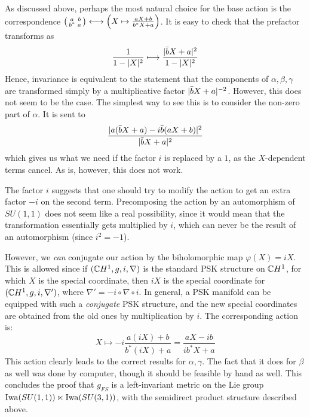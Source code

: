 As discussed above, perhaps the most natural choice for the base action is the correspondence 
$\begin{psmallmatrix}
	a & b \\ b^* & a
\end{psmallmatrix} \longleftrightarrow
\Big(X\mapsto \frac{aX+b}{b^*X+a}\Big)$. It is easy to check that the prefactor transforms as
\begin{equation*}
	\frac{1}{1-\lvert X \rvert^2}\longmapsto \frac{\lvert \bar b X+a \rvert^2}{1-\lvert X \rvert^2}
\end{equation*}
Hence, invariance is equivalent to the statement that the components of $\alpha,\beta,\gamma$ are transformed simply by a multiplicative factor $\lvert \bar b X+a \rvert^{-2}$. However, this does not seem to be the case. The simplest way to see this is to consider the non-zero part of $\alpha$. It is sent to
	\begin{equation*}
		\frac{\lvert a(\bar b X+a)-i\bar b (a X+b) \rvert^2}{\lvert \bar b X+a \rvert^2}
	\end{equation*}
which gives us what we need if the factor $i$ is replaced by a $1$, as the $X$-dependent terms cancel. As is, however, this does not work. 

The factor $i$ suggests that one should try to modify the action to get an extra factor $-i$ on the second term. Precomposing the action by an automorphism of $SU(1,1)$ does not seem like a real possibility, since it would mean that the transformation essentially gets multiplied by $i$, which can never be the result of an automorphism (since $i^2=-1$). 

However, we \emph{can} conjugate our action by the biholomorphic map $\varphi(X)=iX$. This is allowed since if $(\mathbb{C} H^1,g,i,\nabla)$ is the standard PSK structure on $\mathbb{C} H^1$, for which $X$ is the special coordinate, then $iX$ is the special coordinate for $(\mathbb{C} H^1,g,i,\nabla')$, where $\nabla'=-i \circ\nabla \circ i$. In general, a PSK manifold can be equipped with such a \emph{conjugate} PSK structure, and the new special coordinates are obtained from the old ones by multiplication by $i$. The corresponding action is:
\begin{equation*}
	X\longmapsto -i\frac{a(iX)+b}{b^*(iX)+a}
	=\frac{aX-ib}{ib^*X+a}
\end{equation*}
This action clearly leads to the correct results for $\alpha,\gamma$. The fact that it does for $\beta$ as well was done by computer, though it should be feasible by hand as well. This concludes the proof that $g_{FS}$ is a left-invariant metric on the Lie group $\operatorname{Iwa}(SU(1,1))\ltimes \operatorname{Iwa}(SU(3,1))$, with the semidirect product structure described above.

